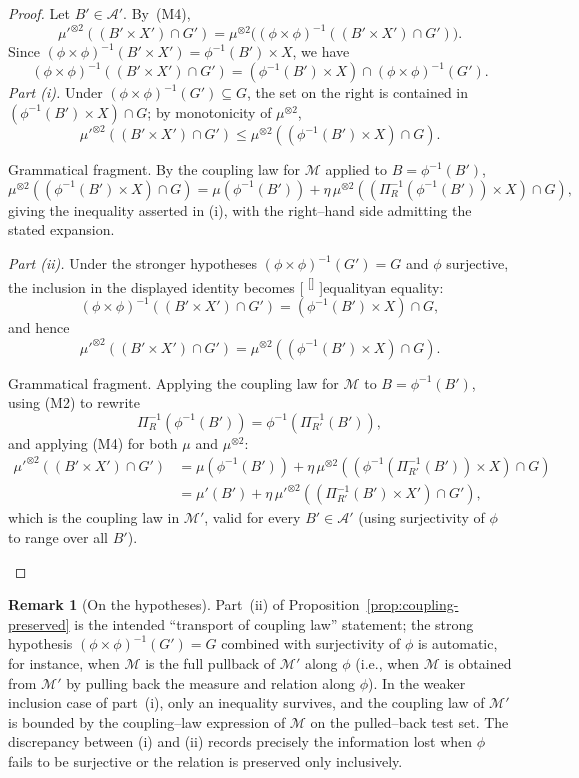 \documentclass[11pt]{article}
\newcounter{ReviewerNoteCount}
\newcommand{\reviewer}[2]{%
    \stepcounter{ReviewerNoteCount}%
    {\color{blue}#1}%
    \textsuperscript{\color{blue}[\theReviewerNoteCount]}%
    \marginpar{\linespread{1.1}\selectfont\color{red}\scriptsize\raggedright\textbf{[\theReviewerNoteCount]} #2}%
}
\numberwithin{equation}{section}
\theoremstyle{definition}
\newtheorem{remark}[theorem]{Remark}
\begin{document}
\begin{proof}
Let $B'\in\mathcal A'$. By~(M4),
\[
\mu'^{\otimes2}((B'\times X')\cap G')=\mu^{\otimes2}\bigl((\phi\times\phi)^{-1}((B'\times X')\cap G')\bigr).
\]
Since $(\phi\times\phi)^{-1}(B'\times X')=\phi^{-1}(B')\times X$, we have
\[
(\phi\times\phi)^{-1}((B'\times X')\cap G')=(\phi^{-1}(B')\times X)\cap(\phi\times\phi)^{-1}(G').
\]
\emph{Part (i).} Under $(\phi\times\phi)^{-1}(G')\subseteq G$, the set on the right is contained in $(\phi^{-1}(B')\times X)\cap G$; by monotonicity of $\mu^{\otimes2}$,
\[
\mu'^{\otimes2}((B'\times X')\cap G')\le\mu^{\otimes2}((\phi^{-1}(B')\times X)\cap G).
\]
\begin{structuralreview}[1]{Grammatical fragment.}
By the coupling law for $\mathcal M$ applied to $B=\phi^{-1}(B')$,
\[
\mu^{\otimes2}((\phi^{-1}(B')\times X)\cap G)=\mu(\phi^{-1}(B'))+\eta\,\mu^{\otimes2}((\Pi_R^{-1}(\phi^{-1}(B'))\times X)\cap G),
\]
giving the inequality asserted in (i), with the right--hand side admitting the stated expansion.
\end{structuralreview}
\emph{Part (ii).} Under the stronger hypotheses $(\phi\times\phi)^{-1}(G')=G$ and $\phi$ surjective, the inclusion in the displayed identity becomes \reviewer[1]{equality}{an equality}:
\[
(\phi\times\phi)^{-1}((B'\times X')\cap G')=(\phi^{-1}(B')\times X)\cap G,
\]
and hence
\[
\mu'^{\otimes2}((B'\times X')\cap G')=\mu^{\otimes2}((\phi^{-1}(B')\times X)\cap G).
\]
\begin{structuralreview}[1]{Grammatical fragment.}
Applying the coupling law for $\mathcal M$ to $B=\phi^{-1}(B')$, using (M2) to rewrite
\[
\Pi_R^{-1}(\phi^{-1}(B'))=\phi^{-1}(\Pi_{R'}^{-1}(B')),
\]
and applying (M4) for both $\mu$ and $\mu^{\otimes2}$:
\begin{align*}
\mu'^{\otimes2}((B'\times X')\cap G')
&=\mu(\phi^{-1}(B'))+\eta\,\mu^{\otimes2}((\phi^{-1}(\Pi_{R'}^{-1}(B'))\times X)\cap G)\\
&=\mu'(B')+\eta\,\mu'^{\otimes2}((\Pi_{R'}^{-1}(B')\times X')\cap G'),
\end{align*}
which is the coupling law in $\mathcal M'$, valid for every $B'\in\mathcal A'$ (using surjectivity of $\phi$ to range over all $B'$).
\end{structuralreview}
\end{proof}

\begin{remark}[On the hypotheses]\label{rem:surjectivity}
Part~(ii) of Proposition~\ref{prop:coupling-preserved} is the intended ``transport of coupling law'' statement; the strong hypothesis $(\phi\times\phi)^{-1}(G')=G$ combined with surjectivity of $\phi$ is automatic, for instance, when $\mathcal M$ is the full pullback of $\mathcal M'$ along $\phi$ (i.e., when $\mathcal M$ is obtained from $\mathcal M'$ by pulling back the measure and relation along $\phi$). In the weaker inclusion case of part~(i), only an inequality survives, and the coupling law of $\mathcal M'$ is bounded by the coupling--law expression of $\mathcal M$ on the pulled--back test set. The discrepancy between (i) and (ii) records precisely the information lost when $\phi$ fails to be surjective or the relation is preserved only inclusively.
\end{remark}
\end{document}
